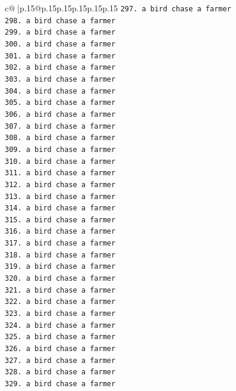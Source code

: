 \documentclass{article}
\begin{document}
{\begin{supertabular}{c@{$\;$}|p{.15\linewidth}@{}p{.15\linewidth}p{.15\linewidth}p{.15\linewidth}p{.15\linewidth}p{.15\linewidth}}
{{{\texttt{297. a bird chase a farmer} \\
\texttt{298. a bird chase a farmer} \\
\texttt{299. a bird chase a farmer} \\
\texttt{300. a bird chase a farmer} \\
\texttt{301. a bird chase a farmer} \\
\texttt{302. a bird chase a farmer} \\
\texttt{303. a bird chase a farmer} \\
\texttt{304. a bird chase a farmer} \\
\texttt{305. a bird chase a farmer} \\
\texttt{306. a bird chase a farmer} \\
\texttt{307. a bird chase a farmer} \\
\texttt{308. a bird chase a farmer} \\
\texttt{309. a bird chase a farmer} \\
\texttt{310. a bird chase a farmer} \\
\texttt{311. a bird chase a farmer} \\
\texttt{312. a bird chase a farmer} \\
\texttt{313. a bird chase a farmer} \\
\texttt{314. a bird chase a farmer} \\
\texttt{315. a bird chase a farmer} \\
\texttt{316. a bird chase a farmer} \\
\texttt{317. a bird chase a farmer} \\
\texttt{318. a bird chase a farmer} \\
\texttt{319. a bird chase a farmer} \\
\texttt{320. a bird chase a farmer} \\
\texttt{321. a bird chase a farmer} \\
\texttt{322. a bird chase a farmer} \\
\texttt{323. a bird chase a farmer} \\
\texttt{324. a bird chase a farmer} \\
\texttt{325. a bird chase a farmer} \\
\texttt{326. a bird chase a farmer} \\
\texttt{327. a bird chase a farmer} \\
\texttt{328. a bird chase a farmer} \\
\texttt{329. a bird chase a farmer} \\
}}}
\end{supertabular}}
\end{document}
